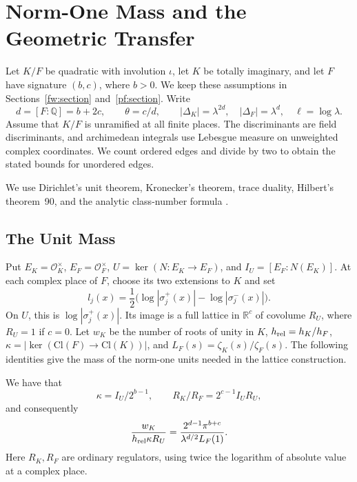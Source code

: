 \section{Norm-One Mass and the Geometric Transfer}
\label{geo:section}

Let $K/F$ be quadratic with involution $\iota$, let $K$ be totally
imaginary, and let $F$ have signature $(b,c)$, where $b>0$. We keep these
assumptions in Sections~\ref{fw:section} and~\ref{pf:section}.
Write
\[
 d=[F:\mathbb Q]=b+2c,\qquad \theta=c/d,
 \qquad |\Delta_K|=\lambda^{2d},\quad
 |\Delta_F|=\lambda^d,\quad \ell=\log\lambda.
\]
Assume that $K/F$ is unramified at all finite places. The discriminants
are field discriminants, and archimedean integrals use Lebesgue measure
on unweighted complex coordinates. We count ordered edges and divide
by two to obtain the stated bounds for unordered edges.

We use Dirichlet's unit theorem, Kronecker's theorem, trace duality,
Hilbert's theorem~90, and the analytic class-number formula
\cite{MilneANT,MilneCFT}.

\subsection{The Unit Mass}

Put $E_K=\mathcal O_K^\times$, $E_F=\mathcal O_F^\times$,
$U=\ker(N:E_K\to E_F)$, and $I_U=[E_F:N(E_K)]$.
At each complex place of $F$, choose its two extensions to $K$ and set
\[
 l_j(x)=\frac12\bigl(\log|\sigma_j^+(x)|-
                         \log|\sigma_j^-(x)|\bigr).
\]
On $U$, this is $\log|\sigma_j^+(x)|$. Its image is a full lattice in
$\mathbb R^c$ of covolume $R_U$, where $R_U=1$ if $c=0$.
Let $w_K$ be the number of roots of unity in $K$,
$h_{\rm rel}=h_K/h_F$, $\kappa=|\ker(\mathrm{Cl}(F)\to\mathrm{Cl}(K))|$,
and $L_F(s)=\zeta_K(s)/\zeta_F(s)$. The following identities give the
mass of the norm-one units needed in the lattice construction.

\begin{proposition}\label{geo:mass}
We have that
\[
 \kappa=I_U/2^{b-1},\qquad
 R_K/R_F=2^{c-1}I_U R_U,
\]
and consequently
\begin{equation}\label{geo:mass-density}
 \frac{w_K}{h_{\rm rel}\kappa R_U}
 =\frac{2^{d-1}\pi^{b+c}}{\lambda^{d/2}L_F(1)}.
\end{equation}
Here $R_K,R_F$ are ordinary regulators, using twice the logarithm of
absolute value at a complex place.
\end{proposition}

